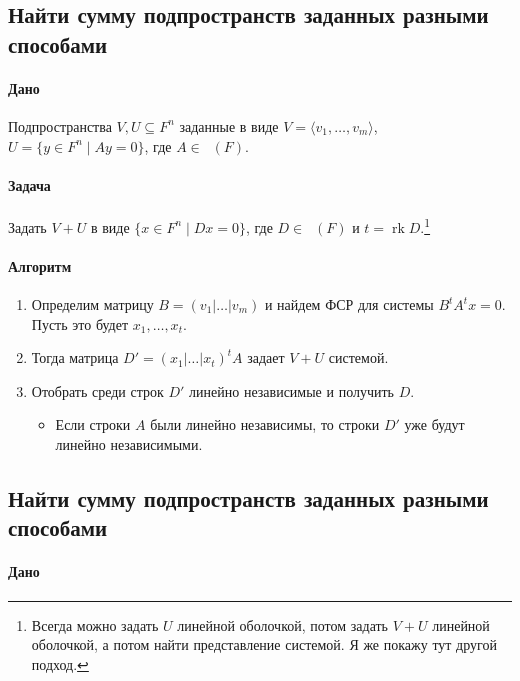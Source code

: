 \documentclass{article}
\newcommand{\MatrixDim}[3]{\mathop{\mathrm{M}_{#2\,#3}}(#1)}
\newcommand{\rk}{\operatorname{rk}}
\begin{document}
\subsection{Найти сумму подпространств заданных разными способами}

\paragraph{Дано}

Подпространства $V,U\subseteq F^{n}$ заданные в виде $V =\langle v_1,\ldots,v_m\rangle$, $U = \{y\in F^{n}\mid Ay = 0\}$, где $A\in \MatrixDim{F}{k}{n}$.

\paragraph{Задача}

Задать $V + U$ в виде $\{x\in F^n \mid Dx = 0\}$, где $D\in \MatrixDim{F}{t}{n}$ и $t = \rk D$.\footnote{Всегда можно задать $U$ линейной оболочкой, потом задать $V+U$ линейной оболочкой, а потом найти представление системой. Я же покажу тут другой подход.}

\paragraph{Алгоритм}
\begin{enumerate}
\item Определим матрицу $B = (v_1|\ldots|v_m)$ и найдем ФСР для системы $B^tA^t x = 0$. Пусть это будет $x_1,\ldots, x_t$.

\item Тогда матрица $D' = (x_1|\ldots|x_t)^tA$ задает $V + U$ системой.

\item Отобрать среди строк $D'$ линейно независимые и получить $D$.
\begin{itemize}
\item Если строки $A$ были линейно независимы, то строки $D'$ уже будут линейно независимыми.
\end{itemize}
\end{enumerate}


\subsection{Найти сумму подпространств заданных разными способами}

\paragraph{Дано}
\end{document}
